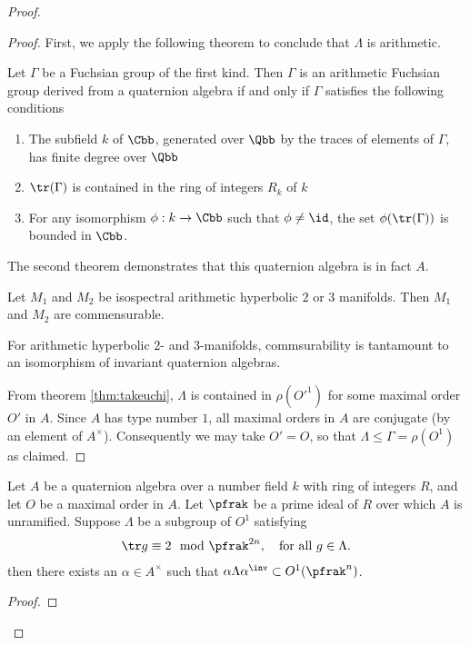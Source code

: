 \begin{proof}
\begin{proof}
    First, we apply the following theorem to conclude that $\Lambda$ is arithmetic.
    \begin{thm}\label{thm:takeuchi}
      Let $\Gamma$ be a Fuchsian group of the first kind. Then $\Gamma$ is an arithmetic Fuchsian group derived from a quaternion algebra if and only if $\Gamma$ satisfies the following conditions
      \begin{enumerate}
        \item The subfield $k$ of $\Cbb$, generated over $\Qbb$ by the traces of elements of $\Gamma$, has finite degree over $\Qbb$
        \item $\tr(\Gamma)$ is contained in the ring of integers $R_{k}$ of $k$
        \item For any isomorphism $\phi: k \to \Cbb$ such that $\phi \neq \id$, the set $\phi(\tr(\Gamma))$ is bounded in $\Cbb$.
      \end{enumerate}
    \end{thm}

    The second theorem demonstrates that this quaternion algebra is in fact $A$.
    \begin{thm}

      Let $M_1$ and $M_2$ be isospectral arithmetic hyperbolic $2$ or $3$ manifolds. Then $M_1$ and $M_2$ are commensurable.
    \end{thm}
    For arithmetic hyperbolic $2$- and $3$-manifolds, commsurability is tantamount to an isomorphism of invariant quaternion algebras.

    From theorem \ref{thm:takeuchi}, $\Lambda$ is contained in $\rho(O'^1)$ for some maximal order $O'$ in $A$. Since $A$ has type number $1$, all maximal orders in $A$ are conjugate (by an element of $A^\times$). Consequently we may take $O'=O$, so that $\Lambda \leq \Gamma = \rho(O^1)$ as claimed.


  \end{proof}
  \begin{lemma}\label{lemma:MangosteenPicosdeEuropa}
    Let $A$ be a quaternion algebra over a number field $k$ with ring of integers $R$, and let $O$ be a maximal order in $A$.
    Let $\pfrak$ be a prime ideal of $R$ over which $A$ is unramified.
    Suppose $\Lambda$ be a subgroup of $O^1$ satisfying
    \begin{align}\label{eq:trace}
      \tr g \equiv 2 \mod \pfrak^{2n}, \quad \text{for all $g \in \Lambda$}.
    \end{align}
    then there exists an $\alpha \in A^\times$ such that $\alpha \Lambda \alpha^\inv \subset O^1(\pfrak^n)$.
  \end{lemma}
  \begin{proof}



\end{proof}
\end{proof}
